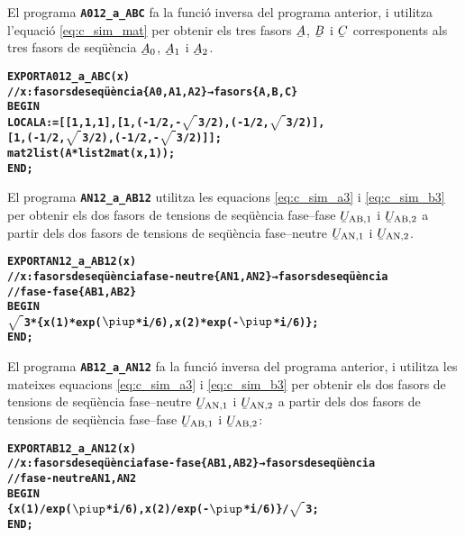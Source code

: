 El programa \texttt{\textbf{A012\_a\_ABC}} fa la funció inversa del programa anterior, i utilitza l'equació \eqref{eq:c_sim_mat} per obtenir els tres fasors
$\cmplx{A}$, $\cmplx{B}$ i $\cmplx{C}$  corresponents als tres fasors de seqüència
$\cmplx{A}_0$, $\cmplx{A}_1$ i  $\cmplx{A}_2$.
\vspace{-6mm}
\begin{alltt}
\bfseries
{}
    EXPORT A012_a_ABC(x)
    // x:fasors de seqüència \{A0,A1,A2\} → fasors \{A,B,C\}
    BEGIN
      LOCAL A:=[[1,1,1],[1,(-1/2,-\(\sqrt{\phantom{|}}\)3/2),(-1/2,\(\sqrt{\phantom{|}}\)3/2)],
                [1,(-1/2,\(\sqrt{\phantom{|}}\)3/2),(-1/2,-\(\sqrt{\phantom{|}}\)3/2)]];
      mat2list(A*list2mat(x,1));
    END;
\end{alltt}

El programa \texttt{\textbf{AN12\_a\_AB12}} utilitza les equacions  \eqref{eq:c_sim_a3} i \eqref{eq:c_sim_b3} per obtenir els dos fasors de tensions de seqüència fase--fase $\cmplx{U}\ped{AB,1}$ i  $\cmplx{U}\ped{AB,2}$ a partir dels dos fasors de tensions de seqüència fase--neutre $\cmplx{U}\ped{AN,1}$ i $\cmplx{U}\ped{AN,2}$.
\vspace{-6mm}
\begin{alltt}
\bfseries
{}
    EXPORT AN12_a_AB12(x)
    // x:fasors de seqüència fase-neutre \{AN1,AN2\} → fasors de seqüència
    // fase-fase \{AB1,AB2\}
    BEGIN
      \(\sqrt{\phantom{|}}\)3*\{x(1)*exp(\(\piup\)*i/6),x(2)*exp(-\(\piup\)*i/6)\};
    END;
\end{alltt}

El programa \texttt{\textbf{AB12\_a\_AN12}} fa la funció inversa del programa anterior, i utilitza les mateixes equacions  \eqref{eq:c_sim_a3} i \eqref{eq:c_sim_b3} per obtenir els dos fasors de tensions de seqüència fase--neutre $\cmplx{U}\ped{AN,1}$ i $\cmplx{U}\ped{AN,2}$ a partir dels dos fasors de tensions de seqüència fase--fase $\cmplx{U}\ped{AB,1}$ i  $\cmplx{U}\ped{AB,2}$:
\vspace{-6mm}
\begin{alltt}
\bfseries
{}
    EXPORT AB12_a_AN12(x)
    // x:fasors de seqüència fase-fase \{AB1,AB2\} → fasors de seqüència
    // fase-neutre {AN1,AN2}
    BEGIN
      \{x(1)/exp(\(\piup\)*i/6),x(2)/exp(-\(\piup\)*i/6)\}/\(\sqrt{\phantom{|}}\)3;
    END;
\end{alltt}


